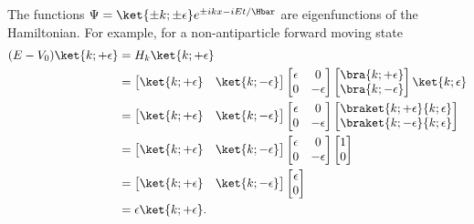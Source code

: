 %
The functions \( \Psi = \ket{\pm k; \pm \epsilon} e^{\pm i k x - i E t/\Hbar} \) are eigenfunctions of the Hamiltonian.  For example, for a non-antiparticle forward moving state
%
\begin{equation}\label{eqn:gradQuantumProblemSet4Problem3:540}
\begin{aligned}
(E - V_0) \ket{k; +\epsilon}
&=
H_k \ket{k; +\epsilon}
\\ &=
\begin{bmatrix}
\ket{k;+\epsilon} &
\ket{k;-\epsilon}
\end{bmatrix}
\begin{bmatrix}
\epsilon & 0 \\
0 & -\epsilon
\end{bmatrix}
\begin{bmatrix}
\bra{k;+\epsilon} \\
\bra{k;-\epsilon}
\end{bmatrix}
\ket{k; \epsilon}
\\ &=
\begin{bmatrix}
\ket{k;+\epsilon} &
\ket{k;-\epsilon}
\end{bmatrix}
\begin{bmatrix}
\epsilon & 0 \\
0 & -\epsilon
\end{bmatrix}
\begin{bmatrix}
\braket{k;+\epsilon}{k; \epsilon} \\
\braket{k;-\epsilon}{k; \epsilon}
\end{bmatrix}
\\ &=
\begin{bmatrix}
\ket{k;+\epsilon} &
\ket{k;-\epsilon}
\end{bmatrix}
\begin{bmatrix}
\epsilon & 0 \\
0 & -\epsilon
\end{bmatrix}
\begin{bmatrix}
1 \\
0
\end{bmatrix}
\\ &=
\begin{bmatrix}
\ket{k;+\epsilon} &
\ket{k;-\epsilon}
\end{bmatrix}
\begin{bmatrix}
\epsilon \\
0
\end{bmatrix}
\\ &=
\epsilon
\ket{k;+\epsilon}.
\end{aligned}
\end{equation}
%
